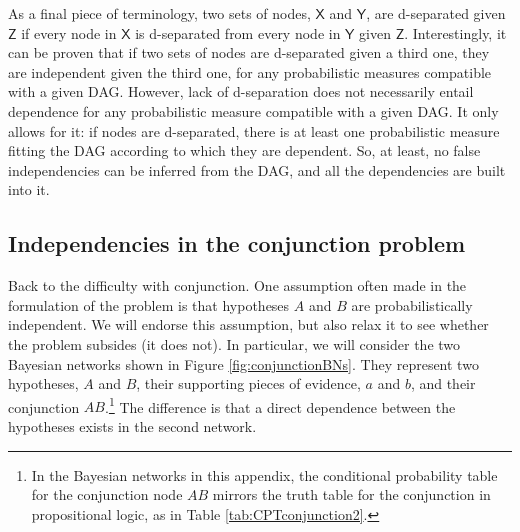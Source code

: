 \documentclass[
  10pt,
  dvipsnames,enabledeprecatedfontcommands]{scrartcl}
\begin{document}
As a final piece of terminology, two sets of nodes, \(\mathsf{X}\) and
\(\mathsf{Y}\), are d-separated given \(\mathsf{Z}\) if every node in
\(\mathsf{X}\) is d-separated from every node in \(\mathsf{Y}\) given
\(\mathsf{Z}\). Interestingly, it can be proven that if two sets of
nodes are d-separated given a third one, they are independent given the
third one, for any probabilistic measures compatible with a given DAG.
However, lack of d-separation does not necessarily entail dependence for
any probabilistic measure compatible with a given DAG. It only allows
for it: if nodes are d-separated, there is at least one probabilistic
measure fitting the DAG according to which they are dependent. So, at
least, no false independencies can be inferred from the DAG, and all the
dependencies are built into it.

\hypertarget{independencies-in-the-conjunction-problem}{%
\subsection*{Independencies in the conjunction
problem}\label{independencies-in-the-conjunction-problem}}

Back to the difficulty with conjunction. One assumption often made in
the formulation of the problem is that hypotheses \(A\) and \(B\) are
probabilistically independent. We will endorse this assumption, but also
relax it to see whether the problem subsides (it does not). In
particular, we will consider the two Bayesian networks shown in Figure
\ref{fig:conjunctionBNs}. They represent two hypotheses, \(A\) and
\(B\), their supporting pieces of evidence, \(a\) and \(b\), and their
conjunction \(AB\).\footnote{In the Bayesian networks in this appendix,
  the conditional probability table for the conjunction node \(AB\)
  mirrors the truth table for the conjunction in propositional logic, as
  in Table \ref{tab:CPTconjunction2}.} The difference is that a direct
dependence between the hypotheses exists in the second network.

\vspace{1mm}
\footnotesize

\normalsize
\end{document}
